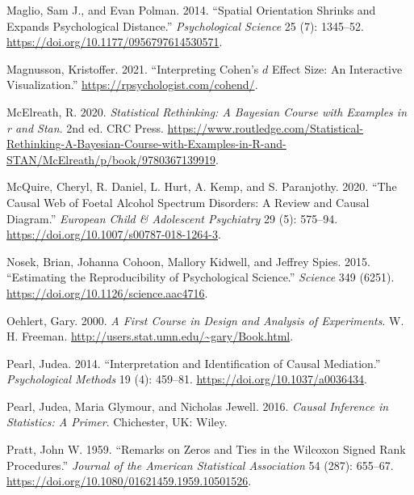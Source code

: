 \documentclass[
  11pt,
  letterpaper,
]{scrbook}
\newlength{\cslhangindent}
\newlength{\cslentryspacingunit} %
\newenvironment{CSLReferences}[2] %
 {%
  \setlength{\parindent}{0pt}
  \ifodd #1
  \let\oldpar\par
  \def\par{\hangindent=\cslhangindent\oldpar}
  \fi
  \setlength{\parskip}{#2\cslentryspacingunit}
 }%
 {}
\theoremstyle{definition}
\theoremstyle{remark}
\begin{document}
\begin{CSLReferences}{1}{0}
\leavevmode{}%
Maglio, Sam J., and Evan Polman. 2014. {``Spatial Orientation Shrinks
and Expands Psychological Distance.''} \emph{Psychological Science} 25
(7): 1345--52. \url{https://doi.org/10.1177/0956797614530571}.

\leavevmode{}%
Magnusson, Kristoffer. 2021. {``Interpreting {C}ohen's \(d\) Effect
Size: An Interactive Visualization.''}
\url{https://rpsychologist.com/cohend/}.

\leavevmode{}%
McElreath, R. 2020. \emph{Statistical Rethinking: A Bayesian Course with
Examples in r and Stan}. 2nd ed. CRC Press.
\url{https://www.routledge.com/Statistical-Rethinking-A-Bayesian-Course-with-Examples-in-R-and-STAN/McElreath/p/book/9780367139919}.

\leavevmode{}%
McQuire, Cheryl, R. Daniel, L. Hurt, A. Kemp, and S. Paranjothy. 2020.
{``The Causal Web of Foetal Alcohol Spectrum Disorders: A Review and
Causal Diagram.''} \emph{European Child {\&} Adolescent Psychiatry} 29
(5): 575--94. \url{https://doi.org/10.1007/s00787-018-1264-3}.

\leavevmode{}%
Nosek, Brian, Johanna Cohoon, Mallory Kidwell, and Jeffrey Spies. 2015.
{``Estimating the Reproducibility of Psychological Science.''}
\emph{Science} 349 (6251).
\url{https://doi.org/10.1126/science.aac4716}.

\leavevmode{}%
Oehlert, Gary. 2000. \emph{A First Course in Design and Analysis of
Experiments}. W. H. Freeman.
\url{http://users.stat.umn.edu/~gary/Book.html}.

\leavevmode{}%
Pearl, Judea. 2014. {``Interpretation and Identification of Causal
Mediation.''} \emph{Psychological Methods} 19 (4): 459--81.
\url{https://doi.org/10.1037/a0036434}.

\leavevmode{}%
Pearl, Judea, Maria Glymour, and Nicholas Jewell. 2016. \emph{Causal
Inference in Statistics: A Primer}. Chichester, UK: Wiley.

\leavevmode{}%
Pratt, John W. 1959. {``Remarks on Zeros and Ties in the {W}ilcoxon
Signed Rank Procedures.''} \emph{Journal of the American Statistical
Association} 54 (287): 655--67.
\url{https://doi.org/10.1080/01621459.1959.10501526}.


\end{CSLReferences}
\end{document}
